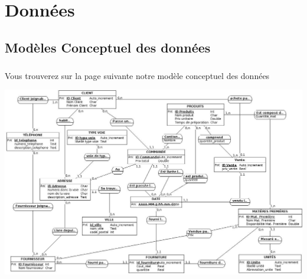 \chapter{Données}

\section{Modèles Conceptuel des données}
\paragraph{}
    Vous trouverez sur la page suivante notre modèle conceptuel des données
    
\pagebreak
\includegraphics[width=\textheight, angle=270]{images/mcd.png}
